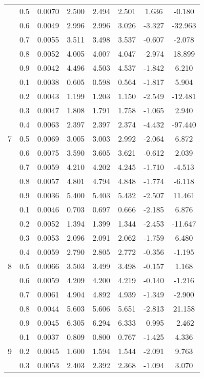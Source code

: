 \documentclass[11pt,a4paper]{report}
\begin{document}
\begin{longtable}{ | c | c || c | c | c | c | c | c | }
 & 0.5 & 0.0070 & 2.500 & 2.494 & 2.501 & 1.636 & -0.180 \\
 & 0.6 & 0.0049 & 2.996 & 2.996 & 3.026 & -3.327 & -32.963 \\
 & 0.7 & 0.0055 & 3.511 & 3.498 & 3.537 & -0.607 & -2.078 \\
 & 0.8 & 0.0052 & 4.005 & 4.007 & 4.047 & -2.974 & 18.899 \\
 & 0.9 & 0.0042 & 4.496 & 4.503 & 4.537 & -1.842 & 6.210 \\
 \hline
\multirow{9}{*}{7} & 0.1 & 0.0038 & 0.605 & 0.598 & 0.564 & -1.817 & 5.904 \\
 & 0.2 & 0.0043 & 1.199 & 1.203 & 1.150 & -2.549 & -12.481 \\
 & 0.3 & 0.0047 & 1.808 & 1.791 & 1.758 & -1.065 & 2.940 \\
 & 0.4 & 0.0063 & 2.397 & 2.397 & 2.374 & -4.432 & -97.440 \\
 & 0.5 & 0.0069 & 3.005 & 3.003 & 2.992 & -2.064 & 6.872 \\
 & 0.6 & 0.0075 & 3.590 & 3.605 & 3.621 & -0.612 & 2.039 \\
 & 0.7 & 0.0059 & 4.210 & 4.202 & 4.245 & -1.710 & -4.513 \\
 & 0.8 & 0.0057 & 4.801 & 4.794 & 4.848 & -1.774 & -6.118 \\
 & 0.9 & 0.0036 & 5.400 & 5.403 & 5.432 & -2.507 & 11.461 \\
 \hline
\multirow{9}{*}{8} & 0.1 & 0.0046 & 0.703 & 0.697 & 0.666 & -2.185 & 6.876 \\
 & 0.2 & 0.0052 & 1.394 & 1.399 & 1.344 & -2.453 & -11.647 \\
 & 0.3 & 0.0053 & 2.096 & 2.091 & 2.062 & -1.759 & 6.480 \\
 & 0.4 & 0.0059 & 2.790 & 2.805 & 2.772 & -0.356 & -1.195 \\
 & 0.5 & 0.0066 & 3.503 & 3.499 & 3.498 & -0.157 & 1.168 \\
 & 0.6 & 0.0059 & 4.209 & 4.200 & 4.219 & -0.140 & -1.216 \\
 & 0.7 & 0.0061 & 4.904 & 4.892 & 4.939 & -1.349 & -2.900 \\
 & 0.8 & 0.0044 & 5.603 & 5.606 & 5.651 & -2.813 & 21.158 \\
 & 0.9 & 0.0045 & 6.305 & 6.294 & 6.333 & -0.995 & -2.462 \\
 \hline
\multirow{9}{*}{9} & 0.1 & 0.0037 & 0.809 & 0.800 & 0.767 & -1.425 & 4.336 \\
 & 0.2 & 0.0045 & 1.600 & 1.594 & 1.544 & -2.091 & 9.763 \\
 & 0.3 & 0.0053 & 2.403 & 2.392 & 2.368 & -1.094 & 3.070 \\

\end{longtable}
\end{document}
